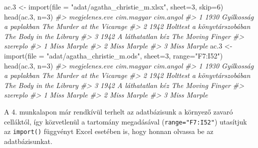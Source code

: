 \documentclass[
]{book}
\newenvironment{Shaded}{\begin{snugshade}}{\end{snugshade}}
\newcommand{\AttributeTok}[1]{\textcolor[rgb]{0.77,0.63,0.00}{#1}}
\newcommand{\CommentTok}[1]{\textcolor[rgb]{0.56,0.35,0.01}{\textit{#1}}}
\newcommand{\DecValTok}[1]{\textcolor[rgb]{0.00,0.00,0.81}{#1}}
\newcommand{\FloatTok}[1]{\textcolor[rgb]{0.00,0.00,0.81}{#1}}
\newcommand{\FunctionTok}[1]{\textcolor[rgb]{0.00,0.00,0.00}{#1}}
\newcommand{\NormalTok}[1]{#1}
\newcommand{\OtherTok}[1]{\textcolor[rgb]{0.56,0.35,0.01}{#1}}
\newcommand{\StringTok}[1]{\textcolor[rgb]{0.31,0.60,0.02}{#1}}
\begin{document}
\begin{Shaded}
\begin{Highlighting}[]
\NormalTok{ac}\FloatTok{.3} \OtherTok{\textless{}{-}} \FunctionTok{import}\NormalTok{(}\AttributeTok{file =} \StringTok{"adat/agatha\_christie\_m.xlsx"}\NormalTok{, }\AttributeTok{sheet=}\DecValTok{3}\NormalTok{, }\AttributeTok{skip=}\DecValTok{6}\NormalTok{)}
\FunctionTok{head}\NormalTok{(ac}\FloatTok{.3}\NormalTok{, }\AttributeTok{n=}\DecValTok{3}\NormalTok{)}
\CommentTok{\#\textgreater{}   megjelenes.eve                  cim.magyar                  cim.angol}
\CommentTok{\#\textgreater{} 1           1930      Gyilkosság a paplakban The Murder at the Vicarage}
\CommentTok{\#\textgreater{} 2           1942 Holttest a könyvtárszobában    The Body in the Library}
\CommentTok{\#\textgreater{} 3           1942           A láthatatlan kéz          The Moving Finger}
\CommentTok{\#\textgreater{}      szereplo}
\CommentTok{\#\textgreater{} 1 Miss Marple}
\CommentTok{\#\textgreater{} 2 Miss Marple}
\CommentTok{\#\textgreater{} 3 Miss Marple}
\NormalTok{ac}\FloatTok{.3} \OtherTok{\textless{}{-}} \FunctionTok{import}\NormalTok{(}\AttributeTok{file =} \StringTok{"adat/agatha\_christie\_m.ods"}\NormalTok{, }\AttributeTok{sheet=}\DecValTok{3}\NormalTok{, }\AttributeTok{range=}\StringTok{"F7:I52"}\NormalTok{)}
\FunctionTok{head}\NormalTok{(ac}\FloatTok{.3}\NormalTok{, }\AttributeTok{n=}\DecValTok{3}\NormalTok{)}
\CommentTok{\#\textgreater{}   megjelenes.eve                  cim.magyar                  cim.angol}
\CommentTok{\#\textgreater{} 1           1930      Gyilkosság a paplakban The Murder at the Vicarage}
\CommentTok{\#\textgreater{} 2           1942 Holttest a könyvtárszobában    The Body in the Library}
\CommentTok{\#\textgreater{} 3           1942           A láthatatlan kéz          The Moving Finger}
\CommentTok{\#\textgreater{}      szereplo}
\CommentTok{\#\textgreater{} 1 Miss Marple}
\CommentTok{\#\textgreater{} 2 Miss Marple}
\CommentTok{\#\textgreater{} 3 Miss Marple}
\end{Highlighting}
\end{Shaded}

A 4. munkalapon már rendkívül terhelt az adatbázisunk a környező zavaró celláktól, így közvetlenül a tartomány megadásával (\texttt{range="F7:I52"}) utasítjuk az \texttt{import()} függvényt Excel esetében is, hogy honnan olvassa be az adatbázisunkat.
\end{document}
